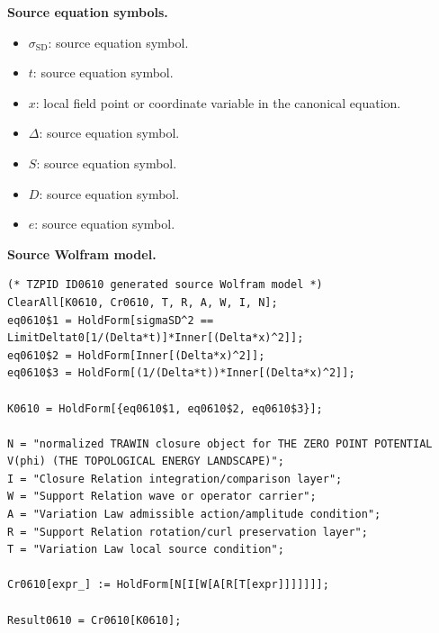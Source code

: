 \begin{minipage}[t]{0.49\linewidth}
\begingroup
\small
\raggedright
\textbf{Source equation symbols.}\par
\begin{itemize}[leftmargin=1.35em,itemsep=1pt,topsep=1pt,parsep=0pt]
    \item $\sigma_{\mathrm{SD}}$: source equation symbol.
    \item $t$: source equation symbol.
    \item $x$: local field point or coordinate variable in the canonical equation.
    \item $\Delta$: source equation symbol.
    \item $S$: source equation symbol.
    \item $D$: source equation symbol.
    \item $e$: source equation symbol.
\end{itemize}
\endgroup
\end{minipage}\hfill
\begin{minipage}[t]{0.47\linewidth}
\begingroup
\scriptsize
\raggedright
\textbf{Source Wolfram model.}\par
\begin{Verbatim}[fontsize=\tiny,breaklines=true,breakanywhere=true]
(* TZPID ID0610 generated source Wolfram model *)
ClearAll[K0610, Cr0610, T, R, A, W, I, N];
eq0610$1 = HoldForm[sigmaSD^2 == LimitDeltat0[1/(Delta*t)]*Inner[(Delta*x)^2]];
eq0610$2 = HoldForm[Inner[(Delta*x)^2]];
eq0610$3 = HoldForm[(1/(Delta*t))*Inner[(Delta*x)^2]];

K0610 = HoldForm[{eq0610$1, eq0610$2, eq0610$3}];

N = "normalized TRAWIN closure object for THE ZERO POINT POTENTIAL V(phi) (THE TOPOLOGICAL ENERGY LANDSCAPE)";
I = "Closure Relation integration/comparison layer";
W = "Support Relation wave or operator carrier";
A = "Variation Law admissible action/amplitude condition";
R = "Support Relation rotation/curl preservation layer";
T = "Variation Law local source condition";

Cr0610[expr_] := HoldForm[N[I[W[A[R[T[expr]]]]]]];

Result0610 = Cr0610[K0610];
\end{Verbatim}
\endgroup
\end{minipage}

